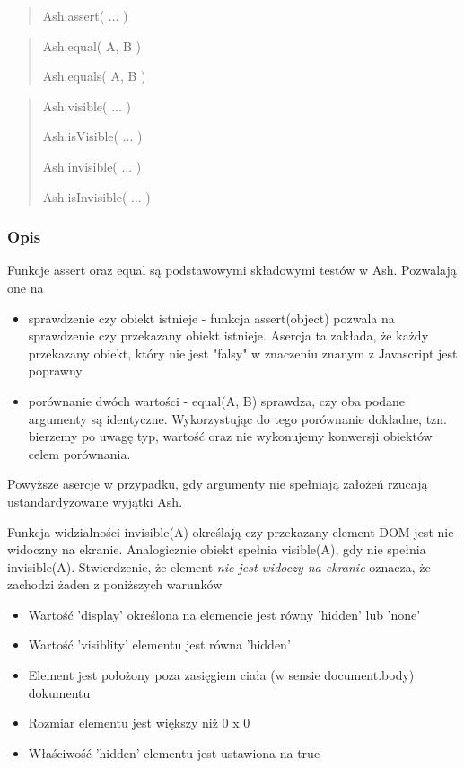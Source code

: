 \documentclass[brudnopis]{xmgr}
\begin{document}
\begin{quote}
Ash.assert( ... ) 
\end{quote}

\begin{quote}
Ash.equal( A, B )

Ash.equals( A, B ) 
\end{quote}

\begin{quote}
Ash.visible( ... ) 

Ash.isVisible( ... )

Ash.invisible( ... )

Ash.isInvisible( ... )
\end{quote}

\subsubsection{Opis}

Funkcje assert oraz equal są podstawowymi składowymi testów w Ash. Pozwalają one na 

\begin{itemize}
  \item sprawdzenie czy obiekt istnieje - funkcja assert(object) pozwala na sprawdzenie czy przekazany obiekt istnieje. Asercja ta zakłada, że każdy przekazany obiekt, który nie jest "falsy" w znaczeniu znanym z Javascript jest poprawny. 
  \item porównanie dwóch wartości - equal(A, B) sprawdza, czy oba podane argumenty są identyczne. Wykorzystując do tego porównanie dokładne, tzn. bierzemy po uwagę typ, wartość oraz nie wykonujemy konwersji obiektów celem porównania.
\end{itemize}
Powyższe asercje w przypadku, gdy argumenty nie spełniają założeń rzucają ustandardyzowane wyjątki Ash. 

Funkcja widzialności invisible(A) określają czy przekazany element DOM jest nie widoczny na ekranie. Analogicznie obiekt spełnia visible(A), gdy nie spełnia invisible(A). Stwierdzenie, że element {\it nie jest widoczy na ekranie} oznacza, że zachodzi żaden z poniższych warunków

\begin{itemize}
  \item Wartość 'display' określona na elemencie jest równy 'hidden' lub 'none'
  \item Wartość 'visiblity' elementu jest równa 'hidden'
  \item Element jest położony poza zasięgiem ciała (w sensie document.body) dokumentu
  \item Rozmiar elementu jest większy niż 0 x 0
  \item Właściwość 'hidden' elementu jest ustawiona na true
\end{itemize}
\end{document}
